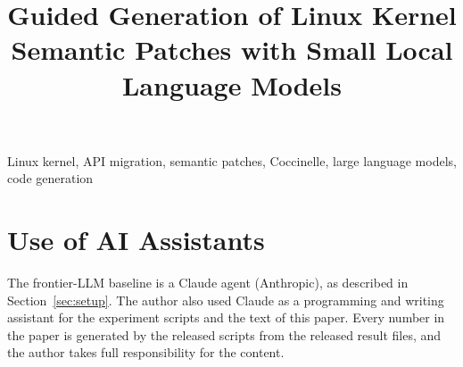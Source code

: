 \documentclass[conference]{IEEEtran}
\begin{document}
\title{Guided Generation of Linux Kernel Semantic Patches with Small Local Language Models}

\author{
}

\maketitle


\begin{IEEEkeywords}
Linux kernel, API migration, semantic patches, Coccinelle, large language models, code generation
\end{IEEEkeywords}









\section*{Use of AI Assistants}
The frontier-LLM baseline is a Claude agent (Anthropic), as described in Section~\ref{sec:setup}. The author also
used Claude as a programming and writing assistant for the experiment scripts and the text of this paper. Every
number in the paper is generated by the released scripts from the released result files, and the author takes
full responsibility for the content.



\end{document}
